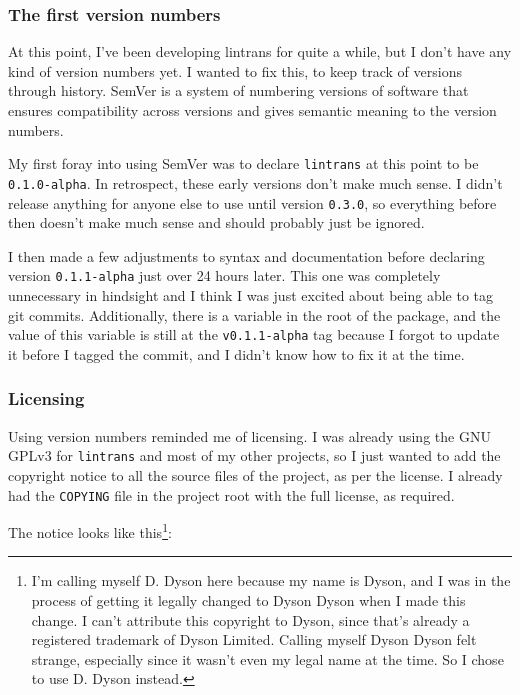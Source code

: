 \documentclass[../development.tex]{subfiles}
\begin{document}
\subsubsection{The first version numbers\label{development:fumbling-with-semver:the-first-version-numbers}}

At this point, I've been developing lintrans for quite a while, but I don't have any kind of version numbers yet. I wanted to fix this, to keep track of versions through history. SemVer\cite{semver-2.0.0} is a system of numbering versions of software that ensures compatibility across versions and gives semantic meaning to the version numbers.

My first foray into using SemVer was to declare \texttt{lintrans} at this point to be \texttt{0.1.0-alpha}. In retrospect, these early versions don't make much sense. I didn't release anything for anyone else to use until version \texttt{0.3.0}, so everything before then doesn't make much sense and should probably just be ignored.

I then made a few adjustments to syntax and documentation before declaring version \texttt{0.1.1-alpha} just over 24 hours later. This one was completely unnecessary in hindsight and I think I was just excited about being able to tag git commits. Additionally, there is a  variable in the root of the package, and the value of this variable is still  at the \texttt{v0.1.1-alpha} tag because I forgot to update it before I tagged the commit, and I didn't know how to fix it at the time.

\subsubsection{Licensing\label{development:fumbling-with-semver:licensing}}

Using version numbers reminded me of licensing. I was already using the GNU GPLv3\cite{gnu-gplv3} for \texttt{lintrans} and most of my other projects, so I just wanted to add the copyright notice to all the source files of the project, as per the license. I already had the \texttt{COPYING} file in the project root with the full license, as required.

The notice looks like this\footnote{I'm calling myself D. Dyson here because my name is Dyson, and I was in the process of getting it legally changed to Dyson Dyson when I made this change. I can't attribute this copyright to Dyson, since that's already a registered trademark of Dyson Limited. Calling myself Dyson Dyson felt strange, especially since it wasn't even my legal name at the time. So I chose to use D. Dyson instead.}:
\end{document}
